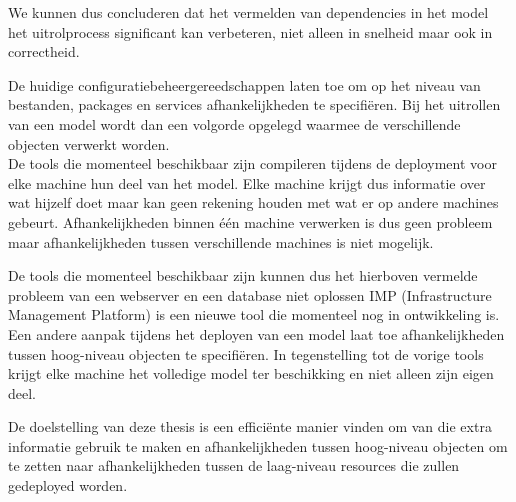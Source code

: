 We kunnen dus concluderen dat het vermelden van dependencies in het model het uitrolprocess significant kan verbeteren, niet alleen in snelheid maar ook in correctheid.

De huidige configuratiebeheergereedschappen laten toe om op het niveau van bestanden, packages en services afhankelijkheden te specifi\"eren.
Bij het uitrollen van een model wordt dan een volgorde opgelegd waarmee de verschillende objecten verwerkt worden.
\\
De tools die momenteel beschikbaar zijn compileren tijdens de deployment voor elke machine hun deel van het model.
Elke machine krijgt dus informatie over wat hijzelf doet maar kan geen rekening houden met wat er op andere machines gebeurt.
Afhankelijkheden binnen \'e\'en machine verwerken is dus geen probleem maar afhankelijkheden tussen verschillende machines is niet mogelijk. 

De tools die momenteel beschikbaar zijn kunnen dus het hierboven vermelde probleem van een webserver en een database niet oplossen
IMP (Infrastructure Management Platform) is een nieuwe tool die momenteel nog in ontwikkeling is.
Een andere aanpak tijdens het deployen van een model laat toe afhankelijkheden tussen hoog-niveau objecten te specifi\"eren.
In tegenstelling tot de vorige tools krijgt elke machine het volledige model ter beschikking en niet alleen zijn eigen deel.

De doelstelling van deze thesis is een effici\"ente manier vinden om van die extra informatie gebruik te maken en afhankelijkheden tussen hoog-niveau objecten om te zetten naar afhankelijkheden tussen de laag-niveau resources die zullen gedeployed worden.


